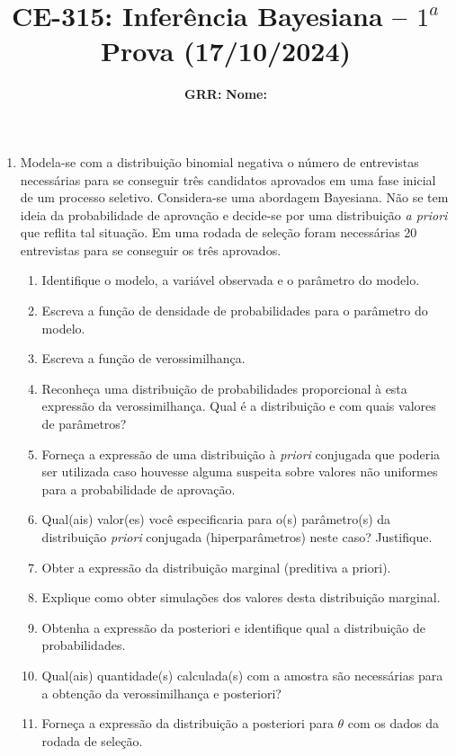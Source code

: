 \documentclass[11pt,a4]{article}\usepackage[]{graphicx}\usepackage[]{xcolor}
\title{CE-315: Inferência Bayesiana -- $1^a$ Prova (17/10/2024)}
\author{\textbf{GRR: }  \raisebox{-0.5ex}{\rule{1.4in}{0.01in}} \textbf{Nome: } \raisebox{-0.5ex}{\rule{3.8in}{0.01in}} }
\date{}
\begin{document}

\pagestyle{empty}
\thispagestyle{empty}

\sloppy

\begin{enumerate}

\item Modela-se com a distribuição binomial negativa o número de entrevistas necessárias para se conseguir três candidatos aprovados em uma fase inicial de um processo seletivo. Considera-se uma abordagem Bayesiana. Não se tem ideia da probabilidade de aprovação e decide-se por uma distribuição {\it a priori} que reflita tal situação. Em uma rodada de seleção foram necessárias 20 entrevistas para se conseguir os três aprovados. 
  \begin{enumerate}
  \item Identifique o modelo, a variável observada e o parâmetro do modelo.
  \item Escreva a função de densidade de probabilidades para o parâmetro do modelo.
  \item Escreva a função de verossimilhança. 
  \item Reconheça uma distribuição de probabilidades proporcional à esta expressão da verossimilhança. Qual é a distribuição e com quais valores de parâmetros? 
  \item Forneça a expressão de uma distribuição à {\it priori} conjugada que poderia ser utilizada caso houvesse alguma suspeita sobre valores não uniformes para a probabilidade de aprovação.
  \item Qual(ais) valor(es) você especificaria para o(s) parâmetro(s) da distribuição {\it priori} conjugada (hiperparâmetros) neste caso? Justifique.
  \item Obter a expressão da distribuição marginal (preditiva a priori).
  \item Explique como obter simulações dos valores desta distribuição marginal.
  \item Obtenha a expressão da posteriori e identifique qual a distribuição de probabilidades.
  \item Qual(ais) quantidade(s) calculada(s) com a amostra são necessárias para a obtenção da verossimilhança e posteriori?
  \item Forneça a expressão da distribuição a posteriori para $\theta$ com os dados da rodada de seleção.

\end{enumerate}
\end{enumerate}
\end{document}
